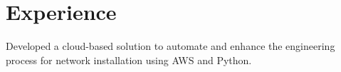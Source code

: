 \documentclass[]{deedy-resume-reversed}
\begin{document}
%
%

%
%

%
%

\begin{minipage}[t]{0.60\textwidth}


\section{Experience}
\vspace{\topsep} %
\begin{tightemize}
\item Developed a cloud-based solution to automate and enhance the engineering process for network installation using AWS and Python.
\end{tightemize}
\sectionsep



\end{minipage}
\end{document}
